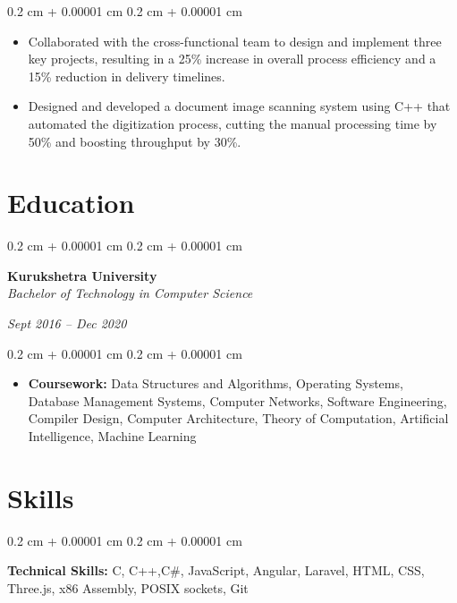 \documentclass[10pt, letterpaper]{article}
\newenvironment{highlights}{
    \begin{itemize}[
        topsep=0.10 cm,
        parsep=0.10 cm,
        partopsep=0pt,
        itemsep=0pt,
        leftmargin=0.4 cm + 10pt
    ]
}{
    \end{itemize}
} %
\newenvironment{onecolentry}{
    \begin{adjustwidth}{
        0.2 cm + 0.00001 cm
    }{
        0.2 cm + 0.00001 cm
    }
}{
    \end{adjustwidth}
} %
\newenvironment{twocolentry}[2][]{
    \onecolentry
    \def\secondColumn{#2}
    \setcolumnwidth{\fill, 4.5 cm}
    \begin{paracol}{2}
}{
    \switchcolumn \raggedleft \secondColumn
    \end{paracol}
    \endonecolentry
} %
\begin{document}
        \vspace{0.10 cm}
        \begin{onecolentry}
            \begin{highlights}
                \item Collaborated with the cross-functional team to design and implement three key projects, resulting in a 25\% increase in overall process efficiency and a 15\% reduction in delivery timelines.
                \item Designed and developed a document image scanning system using C++ that automated the digitization process, cutting the manual processing time by 50\% and boosting throughput by 30\%.
            \end{highlights}
        \end{onecolentry}

    \section{Education}

        \begin{twocolentry}{
        \textit{Sept 2016 – Dec 2020}}
            \textbf{Kurukshetra University} \\
            \textit{Bachelor of Technology in Computer Science}
        \end{twocolentry}

        \vspace{0.10 cm}
        \begin{onecolentry}
            \begin{highlights}
                \item \textbf{Coursework:} Data Structures and Algorithms, Operating Systems, Database Management Systems, Computer Networks, Software Engineering, Compiler Design, Computer Architecture, Theory of Computation, Artificial Intelligence, Machine Learning
            \end{highlights}
        \end{onecolentry}

    \section{Skills}

    \begin{onecolentry}
        \textbf{Technical Skills:} C, C++,C\#, JavaScript, Angular, Laravel, HTML, CSS, Three.js, x86 Assembly, POSIX sockets, Git \end{onecolentry}
\end{document}
